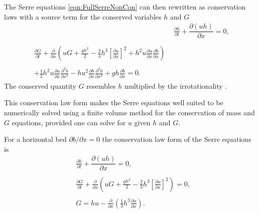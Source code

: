 The Serre equations \eqref{eqn:FullSerreNonCon} can then rewritten as conservation laws with a source term for the conserved variables $h$ and $G$
\begin{subequations}
	\label{eqn:FullSerreCon}
	\begin{align}
	& \frac{\partial h}{\partial t} + \dfrac{\partial (uh)}{\partial x} = 0 ,\label{eqn:FullSerreConMass}  \\ \nonumber \\
	\begin{split}
	\label{eqn:Serreconsconmom}
		\frac{\partial G}{\partial t}  + \frac{\partial}{\partial x} \left( {u} G + \frac{gh^2}{2} - \frac{2}{3}h^3 \left[\frac{\partial {u}}{\partial x}\right]^2 + h^2 {u}\frac{\partial {u}}{\partial x}\frac{\partial b}{\partial x} \right) \\ \\ + \frac{1}{2}h^2 {u} \frac{\partial {u}}{\partial x} \frac{\partial^2 b}{\partial x^2}  - h {u}^2\frac{\partial b}{\partial x}\frac{\partial^2 b}{\partial x^2} + gh\frac{\partial b}{\partial x} = 0.
	\end{split}
	\end{align}
\end{subequations}
The conserved quantity $G$ resembles $h$ multiplied by the irrotationality \cite{Choi-Camassa-1999-1,Carter-Cienfuegos-2011-259}.

This conservation law form makes the Serre equations well suited to be numerically solved using a finite volume method for the conservation of mass and $G$ equations, provided one can solve for $u$ given $h$ and $G$.

For a horizontal bed $\partial b / \partial x = 0$ the conservation law form of the Serre equations is
\begin{subequations}
	\label{eqn:FullSerreConHorizBed}
	\begin{align}
	&\frac{\partial h}{\partial t} + \dfrac{\partial (uh)}{\partial x} = 0, \label{eqn:FullSerreConMassHorizBed} \\  \nonumber \\
	&\frac{\partial G}{\partial t}   + \frac{\partial}{\partial x} \left( {u} G + \frac{gh^2}{2} - \frac{2}{3}h^3 \left[\frac{\partial {u}}{\partial x}\right]^2 \right) = 0 , \label{eqn:SerreconsconmomHorizBed}\\ \nonumber \\
	&G =  h {u}  - \frac{\partial}{\partial x}\left(\frac{1}{3}h^3  \frac{\partial {u}}{\partial x}\right). \label{defn:SerreEqnConservedQuantity1HorizBed}
	\end{align}
\end{subequations}



